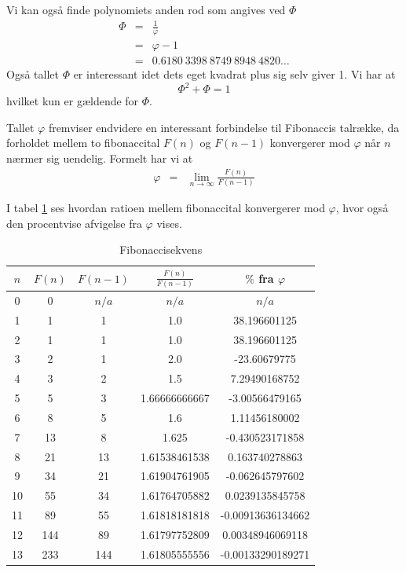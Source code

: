 {Vi kan også finde polynomiets anden rod som angives ved $\varPhi$
\begin{eqnarray*}
	\varPhi & = & \frac{1}{\varphi} \\
		& = & \varphi - 1 \\
		& = & 0.6180\ 3398\ 8749\ 8948\ 4820 \dots
\end{eqnarray*}
Også tallet $\varPhi$ er interessant idet dets eget kvadrat plus sig
selv giver 1. Vi har at
\begin{equation}
	\varPhi^{2} + \varPhi = 1
	\label{Phi_squared}
\end{equation}
hvilket kun er gældende for $\varPhi$.

Tallet $\varphi$ fremviser endvidere en interessant forbindelse til
Fibonaccis talrække, da forholdet mellem to fibonaccital $F(n)$ og $F(n
- 1)$ konvergerer mod $\varphi$ når $n$ nærmer sig uendelig. Formelt har
vi at
\begin{eqnarray*}
	\varphi & =     & \lim_{n \rightarrow\infty}{\frac{F(n)}{F(n - 1)}}
\end{eqnarray*}

I tabel \ref{fibonacci_sequence} ses hvordan ratioen mellem fibonaccital
konvergerer mod $\varphi$, hvor også den procentvise afvigelse fra
$\varphi$ vises.

\begin{table}[h!]
    \centering
    \begin{tabular}{|c|c|c|c|c|}
        \hline
        $n$ & $F(n)$ & $F(n - 1)$ & $ \frac{F(n)}{F(n - 1)}$ & $\%$ fra $\varphi$ \\
        \hline
        0	 & 0 	 & $n/a$ & $n/a$ 		& $n/a$ 		\\
        1	 & 1	 & 1	 & 1.0		 	& 38.196601125 		\\
        2	 & 1	 & 1	 & 1.0		 	& 38.196601125 		\\
        3	 & 2	 & 1	 & 2.0		 	& -23.60679775 		\\
        4	 & 3	 & 2	 & 1.5			& 7.29490168752 	\\
        5	 & 5	 & 3	 & 1.66666666667	& -3.00566479165 	\\
        6	 & 8	 & 5	 & 1.6			& 1.11456180002 	\\
        7	 & 13	 & 8	 & 1.625	 	& -0.430523171858 	\\
        8	 & 21	 & 13	 & 1.61538461538	& 0.163740278863 	\\
        9	 & 34	 & 21	 & 1.61904761905	& -0.062645797602 	\\
        10	 & 55	 & 34	 & 1.61764705882	& 0.0239135845758 	\\
        11	 & 89	 & 55	 & 1.61818181818	& -0.00913636134662 	\\
        12	 & 144	 & 89	 & 1.61797752809	& 0.00348946069118 	\\
        13	 & 233	 & 144	 & 1.61805555556	& -0.00133290189271 	\\
        \hline
    \end{tabular}
    \caption{Fibonaccisekvens}
    \label{fibonacci_sequence}
\end{table}

}
